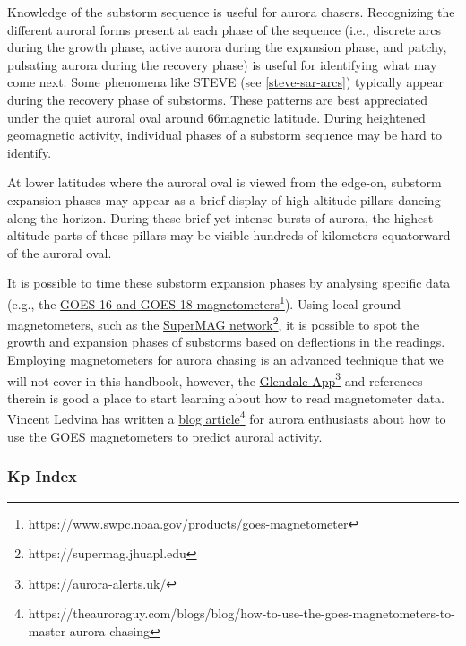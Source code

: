 \documentclass{article}
\begin{document}
Knowledge of the substorm sequence is useful for aurora chasers. Recognizing the different auroral forms present at each phase of the sequence (i.e., discrete arcs during the growth phase, active aurora during the expansion phase, and patchy, pulsating aurora during the recovery phase) is useful for identifying what may come next. Some phenomena like STEVE (see \ref{steve-sar-arcs}) typically appear during the recovery phase of substorms. These patterns are best appreciated under the quiet auroral oval around 66\textdegree magnetic latitude. During heightened geomagnetic activity, individual phases of a substorm sequence may be hard to identify.

At lower latitudes where the auroral oval is viewed from the edge-on, substorm expansion phases may appear as a brief display of high-altitude pillars dancing along the horizon. During these brief yet intense bursts of aurora, the highest-altitude parts of these pillars may be visible hundreds of kilometers equatorward of the auroral oval.

It is possible to time these substorm expansion phases by analysing specific data (e.g., the \href{https://www.swpc.noaa.gov/products/goes-magnetometer}{GOES-16 and GOES-18 magnetometers}\footnote{https://www.swpc.noaa.gov/products/goes-magnetometer}). Using local ground magnetometers, such as the  \href{https://supermag.jhuapl.edu}{SuperMAG network}\footnote{https://supermag.jhuapl.edu}, it is possible to spot the growth and expansion phases of substorms based on deflections in the readings. Employing magnetometers for aurora chasing is an advanced technique that we will not cover in this handbook, however, the \href{https://aurora-alerts.uk/}{Glendale App}\footnote{https://aurora-alerts.uk/} and references therein is good a place to start learning about how to read magnetometer data. Vincent Ledvina has written a \href{https://theauroraguy.com/blogs/blog/how-to-use-the-goes-magnetometers-to-master-aurora-chasing}{blog article}\footnote{https://theauroraguy.com/blogs/blog/how-to-use-the-goes-magnetometers-to-master-aurora-chasing} for aurora enthusiasts about how to use the GOES magnetometers to predict auroral activity.

\subsubsection{Kp Index}\label{kp-index}
\end{document}
